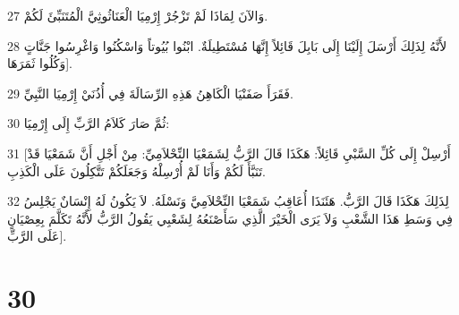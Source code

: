 \par 27 وَالآنَ لِمَاذَا لَمْ تَزْجُرْ إِرْمِيَا الْعَنَاثُوثِيَّ الْمُتَنَبِّئَ لَكُمْ.
\par 28 لأَنَّهُ لِذَلِكَ أَرْسَلَ إِلَيْنَا إِلَى بَابِلَ قَائِلاً إِنَّهَا مُسْتَطِيلَةٌ. ابْنُوا بُيُوتاً وَاسْكُنُوا وَاغْرِسُوا جَنَّاتٍ وَكُلُوا ثَمَرَهَا].
\par 29 فَقَرَأَ صَفَنْيَا الْكَاهِنُ هَذِهِ الرِّسَالَةَ فِي أُذُنَيْ إِرْمِيَا النَّبِيِّ.
\par 30 ثُمَّ صَارَ كَلاَمُ الرَّبِّ إِلَى إِرْمِيَا:
\par 31 [أَرْسِلْ إِلَى كُلِّ السَّبْيِ قَائِلاً: هَكَذَا قَالَ الرَّبُّ لِشَمَعْيَا النِّحْلاَمِيِّ: مِنْ أَجْلِ أَنَّ شَمَعْيَا قَدْ تَنَبَّأَ لَكُمْ وَأَنَا لَمْ أُرْسِلْهُ وَجَعَلَكُمْ تَتَّكِلُونَ عَلَى الْكَذِبِ.
\par 32 لِذَلِكَ هَكَذَا قَالَ الرَّبُّ. هَئَنَذَا أُعَاقِبُ شَمَعْيَا النِّحْلاَمِيَّ وَنَسْلَهُ. لاَ يَكُونُ لَهُ إِنْسَانٌ يَجْلِسُ فِي وَسَطِ هَذَا الشَّعْبِ وَلاَ يَرَى الْخَيْرَ الَّذِي سَأَصْنَعُهُ لِشَعْبِي يَقُولُ الرَّبُّ لأَنَّهُ تَكَلَّمَ بِعِصْيَانٍ عَلَى الرَّبِّ].

\chapter{30}

